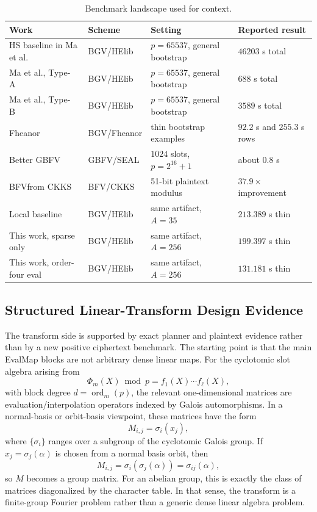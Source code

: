 \documentclass[a4paper,runningheads]{llncs}
\newcommand{\ord}{\operatorname{ord}}
\newcommand{\HElib}{\textsf{HElib}}
\newcommand{\BGV}{\textsf{BGV}}
\newcommand{\BFV}{\textsf{BFV}}
\newcommand{\CKKS}{\textsf{CKKS}}
\newcommand{\GBFV}{\textsf{GBFV}}
\begin{document}
\begin{table}[t]
\centering
\caption{Benchmark landscape used for context.}
\label{tab:literature_numbers}
\scriptsize
\setlength{\tabcolsep}{3pt}
\begin{tabular}{p{3.0cm}p{2.0cm}p{3.8cm}p{3.0cm}}
\toprule
\textbf{Work} & \textbf{Scheme} & \textbf{Setting} & \textbf{Reported result} \\
\midrule
HS baseline in Ma et al.~\cite{ma_large_p}
& \BGV/\HElib & $p=65537$, general bootstrap & $46203$ s total \\
Ma et al., Type-A~\cite{ma_large_p}
& \BGV/\HElib & $p=65537$, general bootstrap & $688$ s total \\
Ma et al., Type-B~\cite{ma_large_p}
& \BGV/\HElib & $p=65537$, general bootstrap & $3589$ s total \\
Fheanor~\cite{fheanor}
& \BGV/Fheanor & thin bootstrap examples & $92.2$ s and $255.3$ s rows \\
Better \GBFV~\cite{better_gbfv}
& \GBFV/SEAL & $1024$ slots, $p=2^{16}+1$ & about $0.8$ s \\
\BFV from \CKKS~\cite{kim_bfv_from_ckks}
& \BFV/\CKKS & 51-bit plaintext modulus & $37.9\times$ improvement \\
\midrule
Local baseline
& \BGV/\HElib & same artifact, $A=35$ & $213.389$ s thin \\
This work, sparse only
& \BGV/\HElib & same artifact, $A=256$ & $199.397$ s thin \\
This work, order-four eval
& \BGV/\HElib & same artifact, $A=256$ & $131.181$ s thin \\
\bottomrule
\end{tabular}
\end{table}

\subsection{Structured Linear-Transform Design Evidence}

The transform side is supported by exact planner and plaintext evidence rather
than by a new positive ciphertext benchmark. The starting point is that the
main EvalMap blocks are not arbitrary dense linear maps. For the cyclotomic slot
algebra arising from
\[
  \Phi_m(X)\bmod p = f_1(X)\cdots f_\ell(X),
\]
with block degree $d=\ord_m(p)$, the relevant one-dimensional matrices are
evaluation/interpolation operators indexed by Galois automorphisms. In a
normal-basis or orbit-basis viewpoint, these matrices have the form
\[
  M_{i,j}=\sigma_i(x_j),
\]
where $\{\sigma_i\}$ ranges over a subgroup of the cyclotomic Galois group. If
$x_j=\sigma_j(\alpha)$ is chosen from a normal basis orbit, then
\[
  M_{i,j}=\sigma_i(\sigma_j(\alpha))=\sigma_{ij}(\alpha),
\]
so $M$ becomes a group matrix. For an abelian group, this is exactly the class
of matrices diagonalized by the character table. In that sense, the transform is
a finite-group Fourier problem rather than a generic dense linear algebra
problem.
\end{document}
